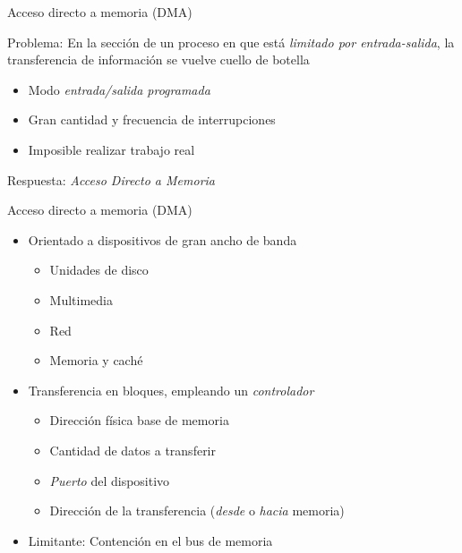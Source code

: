 \documentclass[presentation]{beamer}
\begin{document}
\begin{frame}[label={sec:org76e8d3e}]{Acceso directo a memoria (DMA)}
\begin{center}
Problema: En la sección de un proceso en que está \emph{limitado por
entrada-salida}, la transferencia de información se vuelve cuello de
botella
\end{center}
\begin{itemize}
\item Modo \emph{entrada/salida programada}
\item Gran cantidad y frecuencia de interrupciones
\item Imposible realizar trabajo real
\end{itemize}
\begin{center}
Respuesta: \emph{Acceso Directo a Memoria}
\end{center}
\end{frame}

\begin{frame}[label={sec:org7b2f344}]{Acceso directo a memoria (DMA)}
\begin{itemize}
\item Orientado a dispositivos de gran ancho de banda
\begin{itemize}
\item Unidades de disco
\item Multimedia
\item Red
\item Memoria y caché
\end{itemize}
\item Transferencia en bloques, empleando un \emph{controlador}
\begin{itemize}
\item Dirección física base de memoria
\item Cantidad de datos a transferir
\item \emph{Puerto} del dispositivo
\item Dirección de la transferencia (\emph{desde} o \emph{hacia} memoria)
\end{itemize}
\item Limitante: Contención en el bus de memoria
\end{itemize}
\end{frame}
\end{document}
